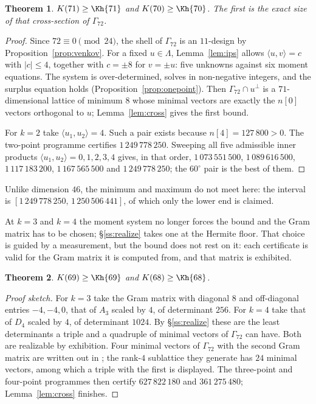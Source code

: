 \documentclass[11pt]{amsart}
\newtheorem{theorem}{Theorem}[section]
\theoremstyle{remark}
\newcommand{\Gsz}{\Gamma_{72}}
\newcommand{\ip}[2]{\langle #1,#2\rangle}
\begin{document}
\begin{theorem}\label{thm:71}
$K(71)\ge\Kh{71}$ and $K(70)\ge\Kh{70}$. The first is the
exact size of that cross-section of $\Gsz$.
\end{theorem}

\begin{proof}
Since $72\equiv0\pmod{24}$, the shell of $\Gsz$ is an $11$-design by
Proposition~\ref{prop:venkov}. For a fixed $u\in\Lambda$, Lemma~\ref{lem:ips}
allows
$\ip{u}{v}=c$ with $|c|\le4$, together with $c=\pm8$ for $v=\pm u$: five
unknowns against six moment equations. The system is over-determined, solves in
non-negative integers, and the surplus equation holds
(Proposition~\ref{prop:onepoint}). Then $\Gsz\cap u^\perp$ is a
$71$-dimensional lattice of minimum $8$ whose minimal vectors are exactly the
$n[0]$ vectors orthogonal to $u$; Lemma~\ref{lem:cross} gives the first
bound.

For $k=2$ take $\ip{u_1}{u_2}=4$. Such a pair exists because $n[4]=127\,800>0$.
The two-point programme certifies $1\,249\,778\,250$. Sweeping all five admissible inner
products $\ip{u_1}{u_2}=0,1,2,3,4$ gives, in that order, $1\,073\,551\,500$,
$1\,089\,616\,500$, $1\,117\,183\,200$, $1\,167\,565\,500$ and
$1\,249\,778\,250$; the $60^\circ$ pair is the best of them.
\end{proof}

Unlike dimension $46$, the minimum and maximum do not meet here: the interval is
$[1\,249\,778\,250,\,1\,250\,506\,441]$, of which only the lower end is claimed.

At $k=3$ and $k=4$ the moment system no longer forces the bound and the Gram
matrix has to be chosen; \S\ref{ss:realize} takes one at the Hermite floor. That
choice is guided by a measurement, but the bound does not rest on it: each
certificate is valid for the Gram matrix it is computed from, and that matrix is
exhibited.

\begin{theorem}\label{thm:6869}
$K(69)\ge\Kh{69}$ and $K(68)\ge\Kh{68}$.
\end{theorem}

\begin{proof}[Proof sketch]
For $k=3$ take the Gram matrix with diagonal $8$ and off-diagonal entries
$-4,-4,0$, that of $A_3$ scaled by $4$, of determinant $256$. For $k=4$ take that
of $D_4$ scaled by $4$, of determinant $1024$. By \S\ref{ss:realize} these are
the least determinants a triple and a quadruple of minimal vectors of $\Gsz$ can
have. Both are realizable by exhibition. Four minimal vectors of $\Gsz$ with the
second Gram matrix are written out in \cite{repo}; the rank-$4$ sublattice they
generate has $24$ minimal vectors, among which a triple with the first is
displayed. The three-point and four-point programmes then certify $627\,822\,180$
and $361\,275\,480$; Lemma~\ref{lem:cross} finishes.
\end{proof}
\end{document}

